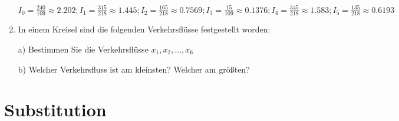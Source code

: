 \begin{enumerate}[label=\alph*)]
{$I_0 = \frac{240}{109}\approx 2.202; I_1 = \frac{315}{218} \approx 1.445;
I_2 = \frac{165}{218}\approx 0.7569; I_3 = \frac{15}{109}\approx
0.1376; I_4 = \frac{345}{218}\approx 1.583; I_5
= \frac{135}{218}\approx 0.6193$}%
\newpage

\item
In einem Kreisel sind die folgenden Verkehrsflüsse festgestellt
worden:


a) Bestimmen Sie die Verkehrsflüsse $x_1, x_2, ..., x_6$

b) Welcher Verkehrsfluss ist am kleinsten? Welcher am größten?





\end{enumerate}
\newpage
\section{Substitution}

